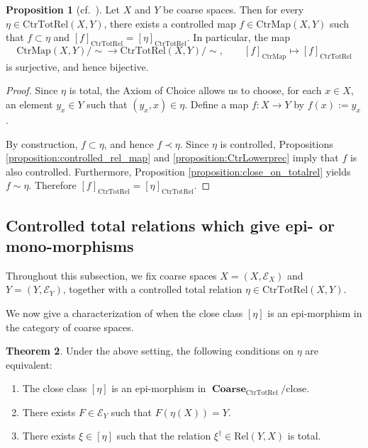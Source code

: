 \documentclass[12pt, a4paper]{amsart}
\theoremstyle{definition}
\newtheorem{theorem}{Theorem}[section]
\newtheorem{proposition}[theorem]{Proposition}
\newcommand{\Coarse}{\mathop{\mathbf{Coarse}}\nolimits}
\newcommand{\Rel}{\mathrm{Rel}}
\newcommand{\CtrMap}{\mathrm{CtrMap}}
\newcommand{\CtrTotRel}{\mathrm{CtrTotRel}}
\newcommand{\close}{\mathrm{close}}
\begin{document}
\begin{proposition}[cf.~{\cite[Lemma 3.31]{MartinezVigolo2026roe}}]
\label{proposition:CtrMapCtrTotRel_surj}
Let $X$ and $Y$ be coarse spaces.
Then for every
$\eta\in\CtrTotRel(X,Y)$,
there exists a controlled map
$f\in\CtrMap(X,Y)$
such that
$f\subset\eta$
and
$[f]_{\CtrTotRel}
=
[\eta]_{\CtrTotRel}$.
In particular, the map
\[
\CtrMap(X,Y)/{\sim}
\longrightarrow
\CtrTotRel(X,Y)/{\sim},
\qquad
[f]_{\CtrMap}
\longmapsto
[f]_{\CtrTotRel}
\]
is surjective, and hence bijective.
\end{proposition}

\begin{proof}
Since $\eta$ is total, the Axiom of Choice allows us to choose, for each
$x\in X$, an element $y_x\in Y$ such that
$(y_x,x)\in\eta$.
Define a map
$f:X\to Y$
by
$f(x):=y_x$.

By construction, $f\subset\eta$, and hence
$f\prec\eta$.
Since $\eta$ is controlled,
Propositions
\ref{proposition:controlled_rel_map}
and
\ref{proposition:CtrLowerprec}
imply that $f$ is also controlled.
Furthermore,
Proposition \ref{proposition:close_on_totalrel} yields
$f\sim\eta$.
Therefore
$[f]_{\CtrTotRel}
=
[\eta]_{\CtrTotRel}$.
\end{proof}

\subsection{Controlled total relations which give epi- or mono-morphisms}

Throughout this subsection, we fix coarse spaces
$X=(X,\mathcal{E}_X)$ and $Y=(Y,\mathcal{E}_Y)$,
together with a controlled total relation
$\eta \in \CtrTotRel(X,Y)$.

We now give a characterization of when the close class $[\eta]$ is an epi-morphism in the category of coarse spaces.

\begin{theorem}\label{thm:epi-characterization}
Under the above setting, the following conditions on $\eta$ are equivalent:
\begin{enumerate}
    \item \label{item:epi-characterization-epi}
    The close class $[\eta]$ is an epi-morphism in
    $\Coarse_{\CtrTotRel}/\close$.
    
    \item \label{item:epi-characterization-dense}
    There exists $F \in \mathcal{E}_Y$ such that
    $F(\eta(X))=Y$.
    
    \item \label{item:epi-characterization-total-adjoint}
    There exists $\xi\in[\eta]$ such that the relation
    $\xi^\dagger \in \Rel(Y,X)$ is total.
\end{enumerate}
\end{theorem}
\end{document}
